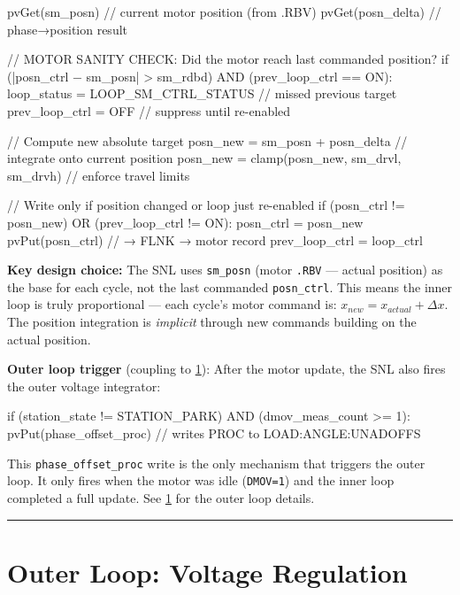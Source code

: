 \begin{sigblock}
pvGet(sm_posn)                              // current motor position (from .RBV)
pvGet(posn_delta)                           // phase→position result

// MOTOR SANITY CHECK: Did the motor reach last commanded position?
if (|posn_ctrl − sm_posn| > sm_rdbd) AND (prev_loop_ctrl == ON):
    loop_status = LOOP_SM_CTRL_STATUS       // missed previous target
    prev_loop_ctrl = OFF                    // suppress until re-enabled

// Compute new absolute target
posn_new = sm_posn + posn_delta             // integrate onto current position
posn_new = clamp(posn_new, sm_drvl, sm_drvh) // enforce travel limits

// Write only if position changed or loop just re-enabled
if (posn_ctrl != posn_new) OR (prev_loop_ctrl != ON):
    posn_ctrl = posn_new
    pvPut(posn_ctrl)                        // → FLNK → motor record
prev_loop_ctrl = loop_ctrl
\end{sigblock}

\textbf{Key design choice:} The SNL uses \texttt{sm\_posn} (motor \texttt{.RBV} --- actual position) as the base for each cycle, not the last commanded \texttt{posn\_ctrl}. This means the inner loop is truly proportional --- each cycle's motor command is: \(x_{new} = x_{actual} + \Delta x\). The position integration is \emph{implicit} through new commands building on the actual position.

\textbf{Outer loop trigger} (coupling to \cref{sec:outer-loop}): After the motor update, the SNL also fires the outer voltage integrator:

\begin{sigblock}
if (station_state != STATION_PARK) AND (dmov_meas_count >= 1):
    pvPut(phase_offset_proc)     // writes PROC to LOAD:ANGLE:UNADOFFS
\end{sigblock}

This \texttt{phase\_\allowbreak{}offset\_\allowbreak{}proc} write is the only mechanism that triggers the outer loop. It only fires when the motor was idle (\texttt{DMOV=1}) and the inner loop completed a full update. See \cref{sec:outer-loop} for the outer loop details.

\begin{center}\rule{0.5\linewidth}{0.5pt}\end{center}

\section{Outer Loop: Voltage Regulation}\label{sec:outer-loop}

